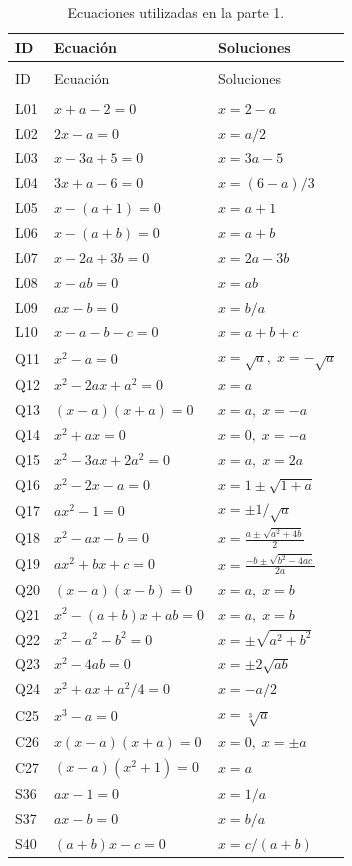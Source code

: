 \begin{longtable}{lll} \caption{Ecuaciones utilizadas en la parte 1.}
\label{tab:equaciones_fase1} \\
\hline
ID & Ecuación & Soluciones \\
\hline \endfirsthead
\multicolumn{3}{c}{\textit{}} \\
\hline
ID & Ecuación & Soluciones \\
\hline \endhead \hline
\multicolumn{3}{r}{\textit{}} \\
\endfoot \hline \endlastfoot
L01 & $x + a - 2 = 0$ & $x = 2 - a$ \\
L02 & $2x - a = 0$ & $x = a/2$ \\
L03 & $x - 3a + 5 = 0$ & $x = 3a - 5$ \\
L04 & $3x + a - 6 = 0$ & $x = (6 - a)/3$ \\
L05 & $x - (a+1) = 0$ & $x = a + 1$ \\
L06 & $x - (a+b) = 0$ & $x = a + b$ \\
L07 & $x - 2a + 3b = 0$ & $x = 2a - 3b$ \\
L08 & $x - ab = 0$ & $x = ab$ \\
L09 & $ax - b = 0$ & $x = b/a$ \\
L10 & $x - a - b - c = 0$ & $x = a + b + c$ \\
Q11 & $x^2 - a = 0$ & $x = \sqrt{a},\; x = -\sqrt{a}$ \\
Q12 & $x^2 - 2ax + a^2 = 0$ & $x = a$ \\
Q13 & $(x - a)(x + a) = 0$ & $x = a,\; x = -a$ \\
Q14 & $x^2 + a x = 0$ & $x = 0,\; x = -a$ \\
Q15 & $x^2 - 3ax + 2a^2 = 0$ & $x = a,\; x = 2a$ \\
Q16 & $x^2 - 2x - a = 0$ & $x = 1 \pm \sqrt{1+a}$ \\
Q17 & $ax^2 - 1 = 0$ & $x = \pm 1/\sqrt{a}$ \\
Q18 & $x^2 - ax - b = 0$ & $x = \frac{a \pm \sqrt{a^2+4b}}{2}$ \\
Q19 & $ax^2 + bx + c = 0$ & $x = \frac{-b \pm \sqrt{b^2-4ac}}{2a}$ \\
Q20 & $(x-a)(x-b) = 0$ & $x = a,\; x = b$ \\
Q21 & $x^2 - (a+b)x + ab = 0$ & $x = a,\; x = b$ \\
Q22 & $x^2 - a^2 - b^2 = 0$ & $x = \pm\sqrt{a^2+b^2}$ \\
Q23 & $x^2 - 4ab = 0$ & $x = \pm 2\sqrt{ab}$ \\
Q24 & $x^2 + ax + a^2/4 = 0$ & $x = -a/2$ \\
C25 & $x^3 - a = 0$ & $x = \sqrt[3]{a}$ \\
C26 & $x(x-a)(x+a) = 0$ & $x = 0,\; x = \pm a$ \\
C27 & $(x-a)(x^2+1) = 0$ & $x = a$ \\
S36 & $a x - 1 = 0$ & $x = 1/a$ \\
S37 & $a x - b = 0$ & $x = b/a$ \\
S40 & $(a+b)x - c = 0$ & $x = c/(a+b)$ \\
\end{longtable}

